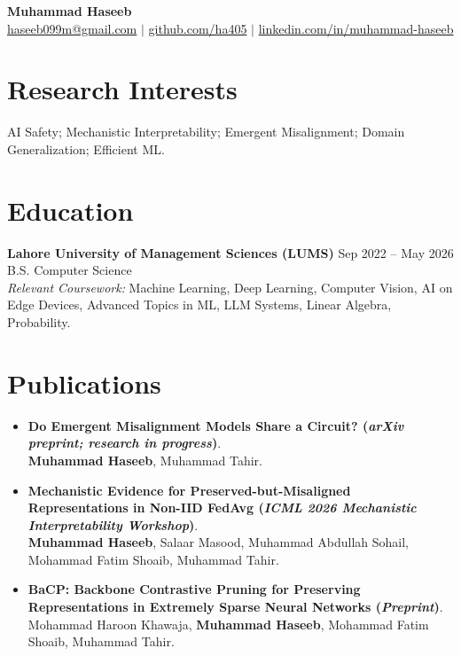 \documentclass[11pt]{article}
\begin{document}
\begin{center}
    {\LARGE\textbf{Muhammad Haseeb}} \\ [0.4em]
    \href{mailto:haseeb099m@gmail.com}{haseeb099m@gmail.com} $\mid$
    \href{https://github.com/ha405}{github.com/ha405} $\mid$
    \href{https://www.linkedin.com/in/muhammad-haseeb-4500b3246/}{linkedin.com/in/muhammad-haseeb}
\end{center}

\section{Research Interests}
AI Safety; Mechanistic Interpretability; Emergent Misalignment; Domain Generalization; Efficient ML.

\section{Education}
\textbf{Lahore University of Management Sciences (LUMS)} \hfill Sep 2022 -- May 2026 \\
B.S. Computer Science \\
\textit{Relevant Coursework:} Machine Learning, Deep Learning, Computer Vision, AI on Edge Devices, Advanced Topics in ML, LLM Systems, Linear Algebra, Probability.

\section{Publications}
\begin{itemize}
    \item \textbf{Do Emergent Misalignment Models Share a Circuit? (\textit{arXiv preprint; research in progress})}.\\
    \textbf{Muhammad Haseeb}, Muhammad Tahir.
    \item \textbf{Mechanistic Evidence for Preserved-but-Misaligned Representations in Non-IID FedAvg (\textit{ICML 2026 Mechanistic Interpretability Workshop})}.\\
    \textbf{Muhammad Haseeb}, Salaar Masood, Muhammad Abdullah Sohail, Mohammad Fatim Shoaib, Muhammad Tahir.
    \item \textbf{BaCP: Backbone Contrastive Pruning for Preserving Representations in Extremely Sparse Neural Networks (\textit{Preprint})}.\\
    Mohammad Haroon Khawaja, \textbf{Muhammad Haseeb}, Mohammad Fatim Shoaib, Muhammad Tahir.
\end{itemize}
\end{document}

